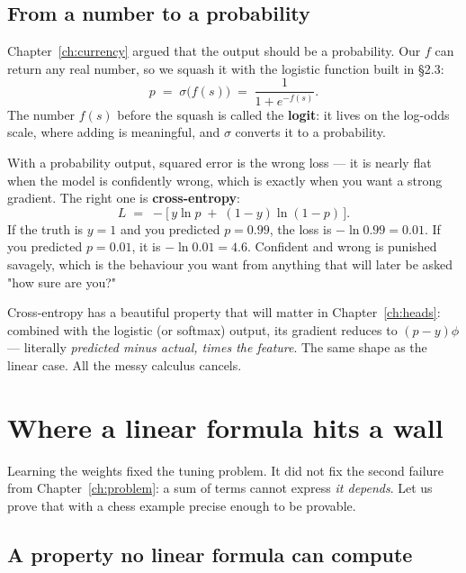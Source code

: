 \subsection{From a number to a probability}

Chapter~\ref{ch:currency} argued that the output should be a probability. Our $f$ can return
any real number, so we squash it with the logistic function built in §2.3:
\[
  p \;=\; \sigma\bigl(f(s)\bigr) \;=\; \frac{1}{1 + e^{-f(s)}} .
\]
The number $f(s)$ before the squash is called the \textbf{logit}: it lives on the log-odds
scale, where adding is meaningful, and $\sigma$ converts it to a probability.

With a probability output, squared error is the wrong loss --- it is nearly flat when the
model is confidently wrong, which is exactly when you want a strong gradient. The right one
is \textbf{cross-entropy}:
\begin{equation}
  \label{eq:crossent}
  L \;=\; -\bigl[\,y\ln p \;+\; (1-y)\ln(1-p)\,\bigr] .
\end{equation}
If the truth is $y=1$ and you predicted $p = 0.99$, the loss is $-\ln 0.99 = 0.01$. If you
predicted $p = 0.01$, it is $-\ln 0.01 = 4.6$. Confident and wrong is punished savagely,
which is the behaviour you want from anything that will later be asked "how sure are you?"

\begin{keyidea}
Cross-entropy has a beautiful property that will matter in Chapter~\ref{ch:heads}: combined
with the logistic (or softmax) output, its gradient reduces to $(p - y)\phi$ --- literally
\emph{predicted minus actual, times the feature}. The same shape as the linear case. All the
messy calculus cancels.
\end{keyidea}

\section{Where a linear formula hits a wall}

Learning the weights fixed the tuning problem. It did not fix the second failure from
Chapter~\ref{ch:problem}: a sum of terms cannot express \emph{it depends}. Let us prove that
with a chess example precise enough to be provable.

\subsection{A property no linear formula can compute}

